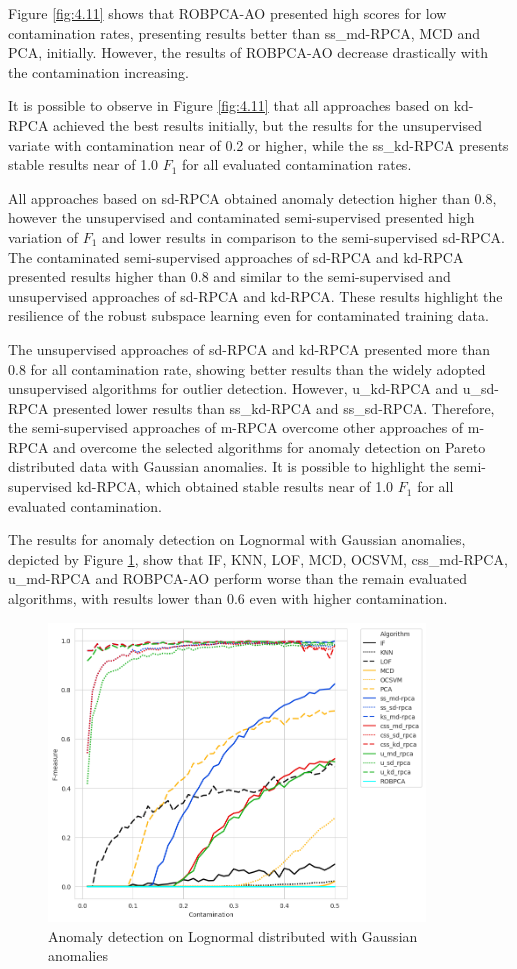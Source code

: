 Figure \ref{fig:4.11} shows that ROBPCA-AO presented high scores for low contamination rates, presenting results better than ss\_md-RPCA, MCD and PCA, initially. However, the results of ROBPCA-AO decrease drastically with the contamination increasing.

It is possible to observe in Figure \ref{fig:4.11} that all approaches based on kd-RPCA achieved the best results initially, but the results for the unsupervised variate with contamination near of 0.2 or higher, while the ss\_kd-RPCA presents stable results near of 1.0 $F_1$ for all evaluated contamination rates.

All approaches based on sd-RPCA obtained anomaly detection higher than 0.8, however the unsupervised and contaminated semi-supervised presented high variation of $F_1$ and lower results in comparison to the semi-supervised sd-RPCA. The contaminated semi-supervised approaches of sd-RPCA and kd-RPCA presented results higher than 0.8 and similar to the semi-supervised and unsupervised approaches of sd-RPCA and kd-RPCA. These results highlight the resilience of the robust subspace learning even for contaminated training data.

The unsupervised approaches of sd-RPCA and kd-RPCA presented more than 0.8 for all contamination rate, showing better results than the widely adopted unsupervised algorithms for outlier detection. However, u\_kd-RPCA and u\_sd-RPCA presented lower results than ss\_kd-RPCA and ss\_sd-RPCA. Therefore, the semi-supervised approaches of m-RPCA overcome other approaches of m-RPCA and overcome the selected algorithms for anomaly detection on Pareto distributed data with Gaussian anomalies. It is possible to highlight the semi-supervised kd-RPCA, which obtained stable results near of 1.0 $F_1$ for all evaluated contamination.

The results for anomaly detection on Lognormal with Gaussian anomalies, depicted by Figure \ref{fig:4.12}, show that IF, KNN, LOF, MCD, OCSVM, css\_md-RPCA, u\_md-RPCA and ROBPCA-AO perform worse than the remain evaluated algorithms, with results lower than 0.6 even with higher contamination. 

\begin{figure}[h!]
	\centering
	\includegraphics[width=10cm]{figures/ch4/lognormal_f1_contamination.png}
	\caption{Anomaly detection on Lognormal distributed with Gaussian anomalies}
	\label{fig:4.12}
\end{figure}

